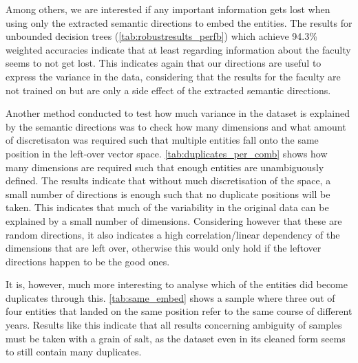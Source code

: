 Among others, we are interested if any important information gets lost when using only the extracted semantic directions to embed the entities. The results for unbounded decision trees (\autoref{tab:robustresults_perfb}) which achieve 94.3\% weighted accuracies indicate that at least regarding information about the faculty seems to not get lost. This indicates again that our directions are useful to express the variance in the data, considering that the results for the faculty are not trained on but are only a side effect of the extracted semantic directions. 

Another method conducted to test how much variance in the dataset is explained by the semantic directions was to check how many dimensions and what amount of discretisaton was required such that multiple entities fall onto the same position in the left-over vector space. \autoref{tab:duplicates_per_comb} shows how many dimensions are required such that enough entities are unambiguously defined. The results indicate that without much discretisation of the space, a small number of directions is enough such that no duplicate positions will be taken. This indicates that much of the variability in the original data can be explained by a small number of dimensions. Considering however that these are random directions, it also indicates a high correlation/linear dependency of the dimensions that are left over, otherwise this would only hold if the leftover directions happen to be the good ones.

It is, however, much more interesting to analyse which of the entities did become duplicates through this. \autoref{tab:same_embed} shows a sample where three out of four entities that landed on the same position refer to the same course of different years. Results like this indicate that all results concerning ambiguity of samples must be taken with a grain of salt, as the dataset even in its cleaned form seems to still contain many duplicates.

\begin{table}[h]
    \centering
    \caption{Sample courses falling onto the same embedding after discretisation.}
    \label{tab:same_embed}
\end{table}

